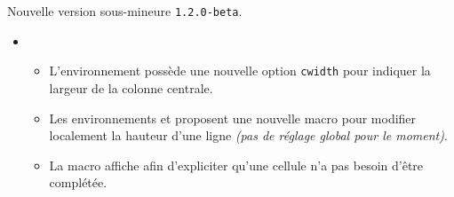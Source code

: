 Nouvelle version sous-mineure \verb+1.2.0-beta+.

\begin{itemize}[itemsep=.5em]
    \item {}
    \begin{itemize}[itemsep=.5em]
        \item L'environnement  possède une nouvelle option \verb#cwidth# pour indiquer la largeur de la colonne centrale.

        \item Les environnements  et  proposent une nouvelle macro  pour modifier localement la hauteur d'une ligne \emph{(pas de réglage global pour le moment)}.
        
        \item La macro  affiche \explnothing{} afin d'expliciter qu'une cellule n'a pas besoin d'être complétée.
    \end{itemize}
\end{itemize}


\separation

